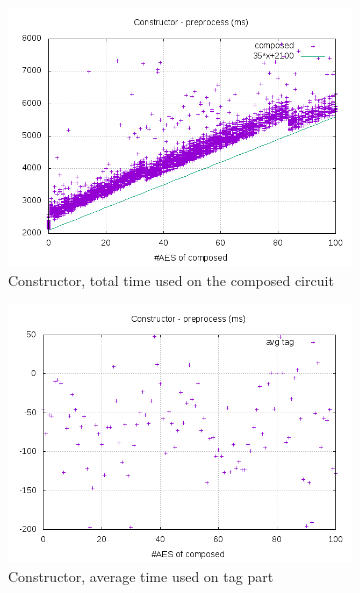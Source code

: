 \documentclass[10pt,a4paper]{article}
\begin{document}
\begin{figure}[h]
    \centering
    \begin{subfigure}[t]{0.3\textwidth}
        \includegraphics[width=\textwidth]{const_preprocess_plots}
        \caption{Constructor, total time used on the composed circuit}
    \end{subfigure}
    \begin{subfigure}[t]{0.3\textwidth}
        \includegraphics[width=\textwidth]{const_preprocess_avg}
        \caption{Constructor, average time used on tag part}
    \end{subfigure}
    \begin{subfigure}[t]{0.3\textwidth}

\end{subfigure}
\end{figure}
\end{document}
